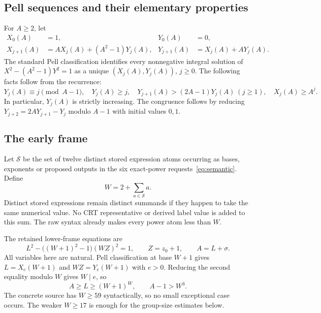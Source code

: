 \documentclass[11pt]{article}
\theoremstyle{definition}\newtheorem{definition}[theorem]{Definition}
\theoremstyle{remark}\newtheorem{remark}[theorem]{Remark}
\begin{document}
\subsection{Pell sequences and their elementary properties}

For $A\ge2$, let
\begin{align*}
 X_0(A)&=1,&Y_0(A)&=0,\\
 X_{j+1}(A)&=AX_j(A)+(A^2-1)Y_j(A),&
 Y_{j+1}(A)&=X_j(A)+AY_j(A).
\end{align*}
The standard Pell classification identifies every nonnegative integral solution of
$X^2-(A^2-1)Y^2=1$ as a unique $(X_j(A),Y_j(A))$, $j\ge0$. The following facts follow from the recurrence:
\begin{equation}\label{eq:pellfacts}
 Y_j(A)\equiv j\pmod{A-1},\quad Y_j(A)\ge j,\quad
 Y_{j+1}(A)>(2A-1)Y_j(A)\ (j\ge1),\quad X_j(A)\ge A^j.
\end{equation}
In particular, $Y_j(A)$ is strictly increasing. The congruence follows by reducing
$Y_{j+2}=2AY_{j+1}-Y_j$ modulo $A-1$ with initial values $0,1$.

\subsection{The early frame}

Let $\mathcal S$ be the set of twelve distinct stored expression atoms occurring as bases, exponents or proposed outputs in the six exact-power requests~\eqref{eq:semantic}. Define
\begin{equation}\label{eq:frameW}
 W=2+\sum_{a\in\mathcal S}a.
\end{equation}
Distinct stored expressions remain distinct summands if they happen to take the same numerical value. No CRT representative or derived label value is added to this sum. The raw syntax already makes every power atom less than $W$.

The retained lower-frame equations are
\begin{equation}\label{eq:lowerframe}
 L^2-\bigl((W+1)^2-1\bigr)(WZ)^2=1,
 \qquad Z=z_0+1,\qquad A=L+\sigma.
\end{equation}
All variables here are natural. Pell classification at base $W+1$ gives
$L=X_e(W+1)$ and $WZ=Y_e(W+1)$ with $e>0$. Reducing the second equality modulo $W$ gives $W\mid e$, so
\begin{equation}\label{eq:largeA}
 A\ge L\ge(W+1)^W,\qquad A-1>W^3.
\end{equation}
The concrete source has $W\ge59$ syntactically, so no small exceptional case occurs. The weaker $W\ge17$ is enough for the group-size estimates below.
\end{document}
